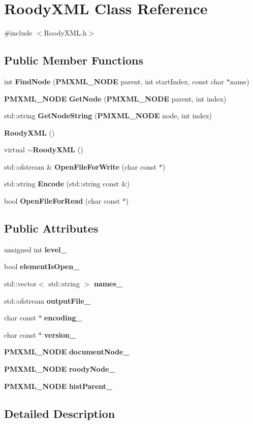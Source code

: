 \section{RoodyXML Class Reference}
\label{classRoodyXML}


{\ttfamily \#include $<$RoodyXML.h$>$}\subsection*{Public Member Functions}
\begin{DoxyCompactItemize}
\item 
int {\bf FindNode} ({\bf PMXML\_\-NODE} parent, int startIndex, const char $\ast$name)
\item 
{\bf PMXML\_\-NODE} {\bf GetNode} ({\bf PMXML\_\-NODE} parent, int index)
\item 
std::string {\bf GetNodeString} ({\bf PMXML\_\-NODE} node, int index)
\item 
{\bf RoodyXML} ()
\item 
virtual {\bf $\sim$RoodyXML} ()
\item 
std::ofstream \& {\bf OpenFileForWrite} (char const $\ast$)
\item 
std::string {\bf Encode} (std::string const \&)
\item 
bool {\bf OpenFileForRead} (char const $\ast$)
\end{DoxyCompactItemize}
\subsection*{Public Attributes}
\begin{DoxyCompactItemize}
\item 
unsigned int {\bf level\_\-}
\item 
bool {\bf elementIsOpen\_\-}
\item 
std::vector$<$ std::string $>$ {\bf names\_\-}
\item 
std::ofstream {\bf outputFile\_\-}
\item 
char const $\ast$ {\bf encoding\_\-}
\item 
char const $\ast$ {\bf version\_\-}
\item 
{\bf PMXML\_\-NODE} {\bf documentNode\_\-}
\item 
{\bf PMXML\_\-NODE} {\bf roodyNode\_\-}
\item 
{\bf PMXML\_\-NODE} {\bf histParent\_\-}
\end{DoxyCompactItemize}


\subsection{Detailed Description}


